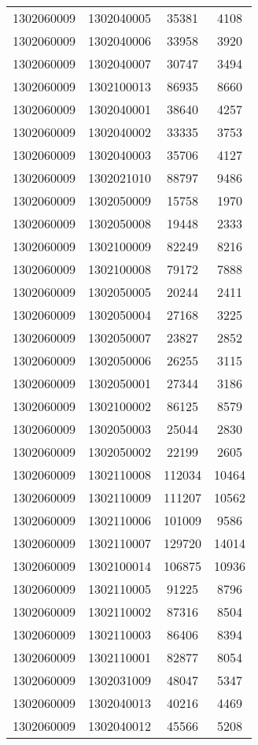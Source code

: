 \begin{longtable}{llcc}
1302060009 & 1302040005 & 35381 & 4108\\
1302060009 & 1302040006 & 33958 & 3920\\
1302060009 & 1302040007 & 30747 & 3494\\
1302060009 & 1302100013 & 86935 & 8660\\
1302060009 & 1302040001 & 38640 & 4257\\
1302060009 & 1302040002 & 33335 & 3753\\
1302060009 & 1302040003 & 35706 & 4127\\
1302060009 & 1302021010 & 88797 & 9486\\
1302060009 & 1302050009 & 15758 & 1970\\
1302060009 & 1302050008 & 19448 & 2333\\
1302060009 & 1302100009 & 82249 & 8216\\
1302060009 & 1302100008 & 79172 & 7888\\
1302060009 & 1302050005 & 20244 & 2411\\
1302060009 & 1302050004 & 27168 & 3225\\
1302060009 & 1302050007 & 23827 & 2852\\
1302060009 & 1302050006 & 26255 & 3115\\
1302060009 & 1302050001 & 27344 & 3186\\
1302060009 & 1302100002 & 86125 & 8579\\
1302060009 & 1302050003 & 25044 & 2830\\
1302060009 & 1302050002 & 22199 & 2605\\
1302060009 & 1302110008 & 112034 & 10464\\
1302060009 & 1302110009 & 111207 & 10562\\
1302060009 & 1302110006 & 101009 & 9586\\
1302060009 & 1302110007 & 129720 & 14014\\
1302060009 & 1302100014 & 106875 & 10936\\
1302060009 & 1302110005 & 91225 & 8796\\
1302060009 & 1302110002 & 87316 & 8504\\
1302060009 & 1302110003 & 86406 & 8394\\
1302060009 & 1302110001 & 82877 & 8054\\
1302060009 & 1302031009 & 48047 & 5347\\
1302060009 & 1302040013 & 40216 & 4469\\
1302060009 & 1302040012 & 45566 & 5208\\

\end{longtable}

